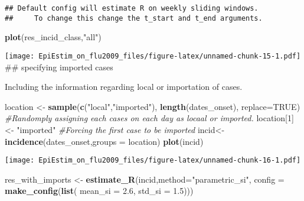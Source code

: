 \documentclass[
]{article}
\newenvironment{Shaded}{\begin{snugshade}}{\end{snugshade}}
\newcommand{\AttributeTok}[1]{\textcolor[rgb]{0.13,0.29,0.53}{#1}}
\newcommand{\CommentTok}[1]{\textcolor[rgb]{0.56,0.35,0.01}{\textit{#1}}}
\newcommand{\ConstantTok}[1]{\textcolor[rgb]{0.56,0.35,0.01}{#1}}
\newcommand{\DecValTok}[1]{\textcolor[rgb]{0.00,0.00,0.81}{#1}}
\newcommand{\FloatTok}[1]{\textcolor[rgb]{0.00,0.00,0.81}{#1}}
\newcommand{\FunctionTok}[1]{\textcolor[rgb]{0.13,0.29,0.53}{\textbf{#1}}}
\newcommand{\NormalTok}[1]{#1}
\newcommand{\OtherTok}[1]{\textcolor[rgb]{0.56,0.35,0.01}{#1}}
\newcommand{\StringTok}[1]{\textcolor[rgb]{0.31,0.60,0.02}{#1}}
\begin{document}
\begin{verbatim}
## Default config will estimate R on weekly sliding windows.
##     To change this change the t_start and t_end arguments.
\end{verbatim}

\begin{Shaded}
\begin{Highlighting}[]
\FunctionTok{plot}\NormalTok{(res\_incid\_class,}\StringTok{"all"}\NormalTok{)}
\end{Highlighting}
\end{Shaded}

\texttt{[image: EpiEstim\_on\_flu2009\_files/figure-latex/unnamed-chunk-15-1.pdf]}
\#\# specifying imported cases

Including the information regarding local or importation of cases.

\begin{Shaded}
\begin{Highlighting}[]
\NormalTok{location }\OtherTok{\textless{}{-}} \FunctionTok{sample}\NormalTok{(}\FunctionTok{c}\NormalTok{(}\StringTok{"local"}\NormalTok{,}\StringTok{"imported"}\NormalTok{), }\FunctionTok{length}\NormalTok{(dates\_onset), }\AttributeTok{replace=}\ConstantTok{TRUE}\NormalTok{) }\CommentTok{\#Randomply assigning each cases on each day as locaal or imported.}
\NormalTok{location[}\DecValTok{1}\NormalTok{]}\OtherTok{\textless{}{-}} \StringTok{"imported"} \CommentTok{\#Forcing the first case to be imported}
\NormalTok{incid}\OtherTok{\textless{}{-}}\FunctionTok{incidence}\NormalTok{(dates\_onset,}\AttributeTok{groups =}\NormalTok{ location)}
\FunctionTok{plot}\NormalTok{(incid)}
\end{Highlighting}
\end{Shaded}

\texttt{[image: EpiEstim\_on\_flu2009\_files/figure-latex/unnamed-chunk-16-1.pdf]}

\begin{Shaded}
\begin{Highlighting}[]
\NormalTok{res\_with\_imports }\OtherTok{\textless{}{-}} \FunctionTok{estimate\_R}\NormalTok{(incid,}\AttributeTok{method=}\StringTok{"parametric\_si"}\NormalTok{, }\AttributeTok{config =} \FunctionTok{make\_config}\NormalTok{(}\FunctionTok{list}\NormalTok{(}
                   \AttributeTok{mean\_si =} \FloatTok{2.6}\NormalTok{, }\AttributeTok{std\_si =} \FloatTok{1.5}\NormalTok{)))}
\end{Highlighting}
\end{Shaded}
\end{document}
